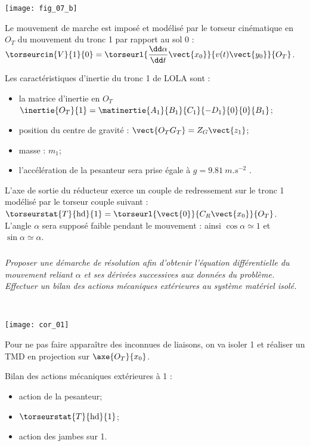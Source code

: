 \begin{multicols}{2}
\begin{center}
\texttt{[image: fig\_07\_b]}
\end{center}

Le mouvement de marche est imposé et modélisé par le torseur cinématique en $O_T$ du mouvement du tronc 1
par rapport au sol 0 : $\torseurcin{V}{1}{0}=\torseurl{\dfrac{\dd \alpha}{\dd t}\vect{x_0}}{v(t)\vect{y_0}}{O_T}$.

Les caractéristiques d'inertie du tronc 1 de LOLA sont :
\begin{itemize}
\item la matrice d'inertie en $O_T$ $\inertie{O_T}{1} = \matinertie{A_1}{B_1}{C_1}{-D_1}{0}{0}{B_1}$;
\item position du centre de gravité : $\vect{O_TG_T}=Z_G\vect{z_1}$;
\item masse : $m_1$;
\item l'accélération de la pesanteur sera prise égale à $g=\SI{9,81}{m.s^{-2}}$ .
\end{itemize}


L'axe de sortie du réducteur exerce un couple de redressement sur le tronc 1 modélisé par le torseur couple
suivant : $\torseurstat{T}{\text{hd}}{1}=\torseurl{\vect{0}}{C_R\vect{x_0}}{O_T}$. L'angle $\alpha$ sera supposé faible pendant le mouvement : ainsi $\cos \alpha \simeq 1$ et $\sin \alpha \simeq \alpha$.

\fi
\subparagraph{} \textit{Proposer une démarche de résolution afin d'obtenir l'équation différentielle du mouvement reliant $\alpha$ et
ses dérivées successives aux données du problème. Effectuer un bilan des actions mécaniques
extérieures au système matériel isolé.}
\ifprof
\begin{corrige} ~\\

\begin{center}
\texttt{[image: cor\_01]}
\end{center}

Pour ne pas faire apparaître des inconnues de liaisons, on va isoler 1 et réaliser un TMD en projection sur $\axe{O_T}{x_0}$.

Bilan des actions mécaniques extérieures à 1 : 
\begin{itemize}
\item action de la pesanteur;
\item $\torseurstat{T}{\text{hd}}{1}$;
\item action des jambes sur 1. 
\end{itemize}
\end{corrige}
\else
\fi



\end{multicols}
